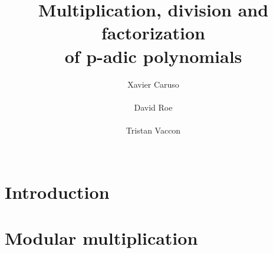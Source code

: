 \documentclass{sig-alternate-2013}
\newcommand{\RS}{\text{\rm RS}}
\begin{document}
\newtheorem{theo}{Theorem}[section]
\newtheorem{lem}[theo]{Lemma}
\newtheorem{prop}[theo]{Proposition}
\newtheorem{cor}[theo]{Corollary}
\newtheorem{quest}[theo]{Question}
\newtheorem{conj}[theo]{Conjecture}
\theoremstyle{definition}
\newtheorem{rem}[theo]{Remark}
\newtheorem{ex}[theo]{Example}
\newtheorem{deftn}[theo]{Definition}

\title{Multiplication, division and factorization\\of p-adic polynomials}

\author{
\alignauthor Xavier Caruso\\
  \\
\alignauthor David Roe \\
  \\
\alignauthor Tristan Vaccon\\
  \\
}

\maketitle

\begin{abstract}
\end{abstract}

\keywords{}

%
%

\section{Introduction}

\section{Modular multiplication}
\end{document}
